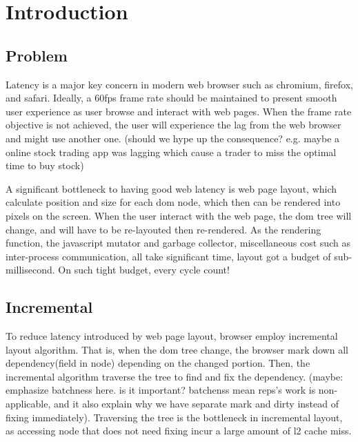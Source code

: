 \documentclass[format=acmsmall, review=false, screen=true]{acmart}
\begin{document}
\maketitle

\renewcommand{\shortauthors}{G. Zhou et al.}

\section{Introduction}
\subsection{Problem}
Latency is a major key concern in modern web browser such as chromium, firefox, and safari. Ideally, a 60fps frame rate should be maintained to present smooth user experience as user browse and interact with web pages. When the frame rate objective is not achieved, the user will experience the lag from the web browser and might use another one. (should we hype up the consequence? e.g. maybe a online stock trading app was lagging which cause a trader to miss the optimal time to buy stock)

A significant bottleneck to having good web latency is web page layout, which calculate position and size for each dom node, which then can be rendered into pixels on the screen. When the user interact with the web page, the dom tree will change, and will have to be re-layouted then re-rendered. As the rendering function, the javascript mutator and garbage collector, miscellaneous cost such as inter-process communication, all take significant time, layout got a budget of sub-millisecond. On such tight budget, every cycle count!

\subsection{Incremental}
To reduce latency introduced by web page layout, browser employ incremental layout algorithm. That is, when the dom tree change, the browser mark down all dependency(field in node) depending on the changed portion. Then, the incremental algorithm traverse the tree to find and fix the dependency. (maybe: emphasize batchness here. is it important? batchenss mean reps's work is non-applicable, and it also explain why we have separate mark and dirty instead of fixing immediately). Traversing the tree is the bottleneck in incremental layout, as accessing node that does not need fixing incur a large amount of l2 cache miss.
\end{document}
